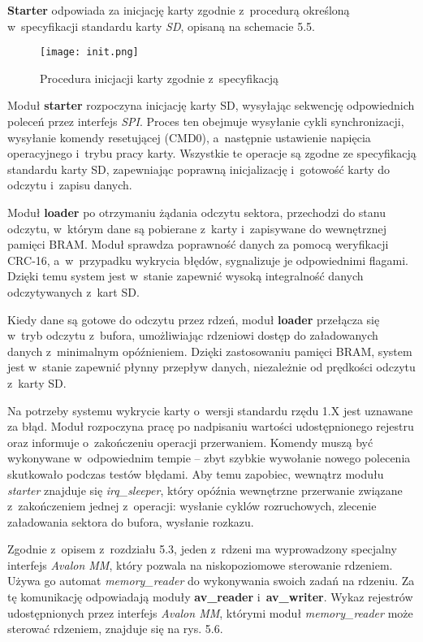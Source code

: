 \textbf{Starter} odpowiada za inicjację karty zgodnie z~procedurą określoną w~specyfikacji standardu karty \textit{SD}, opisaną na schemacie 5.5.

\begin{figure}[h]
	\centering
	\texttt{[image: init.png]}
	\caption{Procedura inicjacji karty zgodnie z~specyfikacją \cite{SDA}}
\end{figure}
\FloatBarrier %

Moduł \textbf{starter} rozpoczyna inicjację karty SD, wysyłając sekwencję odpowiednich poleceń przez interfejs \textit{SPI}. Proces ten obejmuje wysyłanie cykli synchronizacji, wysyłanie komendy resetującej (CMD0), a~następnie ustawienie napięcia operacyjnego i~trybu pracy karty. Wszystkie te operacje są zgodne ze specyfikacją standardu karty SD, zapewniając poprawną inicjalizację i~gotowość karty do odczytu i~zapisu danych.

Moduł \textbf{loader} po otrzymaniu żądania odczytu sektora, przechodzi do stanu odczytu, w~którym dane są pobierane z~karty i~zapisywane do wewnętrznej pamięci BRAM. Moduł sprawdza poprawność danych za pomocą weryfikacji CRC-16, a~w~przypadku wykrycia błędów, sygnalizuje je odpowiednimi flagami. Dzięki temu system jest w~stanie zapewnić wysoką integralność danych odczytywanych z~kart SD.

Kiedy dane są gotowe do odczytu przez rdzeń, moduł \textbf{loader} przełącza się w~tryb odczytu z~bufora, umożliwiając rdzeniowi dostęp do załadowanych danych z~minimalnym opóźnieniem. Dzięki zastosowaniu pamięci BRAM, system jest w~stanie zapewnić płynny przepływ danych, niezależnie od prędkości odczytu z~karty SD.

Na potrzeby systemu wykrycie karty o~wersji standardu rzędu 1.X jest uznawane za błąd. Moduł rozpoczyna pracę po nadpisaniu wartości udostępnionego rejestru oraz informuje o~zakończeniu operacji przerwaniem. Komendy muszą być wykonywane w~odpowiednim tempie – zbyt szybkie wywołanie nowego polecenia skutkowało podczas testów błędami. Aby temu zapobiec, wewnątrz modułu \textit{starter} znajduje się \textit{irq\_sleeper}, który opóźnia wewnętrzne przerwanie związane z~zakończeniem jednej z~operacji: wysłanie cyklów rozruchowych, zlecenie załadowania sektora do bufora, wysłanie rozkazu.

Zgodnie z~opisem z~rozdziału 5.3, jeden z~rdzeni ma wyprowadzony specjalny interfejs \textit{Avalon MM}, który pozwala na niskopoziomowe sterowanie rdzeniem. Używa go automat \textit{memory\_reader} do wykonywania swoich zadań na rdzeniu. Za tę komunikację odpowiadają moduły \textbf{av\_reader} i~\textbf{av\_writer}. Wykaz rejestrów udostępnionych przez interfejs \textit{Avalon MM}, którymi moduł \textit{memory\_reader} może sterować rdzeniem, znajduje się na rys. 5.6.

